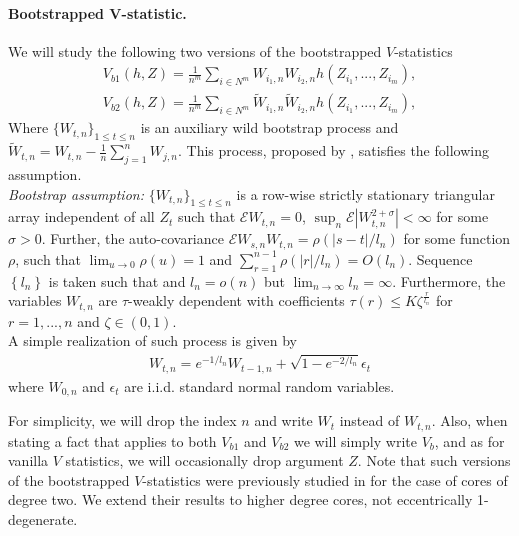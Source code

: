 \documentclass{article} %
\newcommand{\ev}{\mathcal{E}}
\begin{document}
\paragraph{Bootstrapped V-statistic.} 
We will study the following two versions of the bootstrapped $V$-statistics  
\begin{align}
 V_{b1}(h,Z) = \frac{1}{n^m} \sum_{i \in N^m} W_{i_1,n} W_{i_2,n} h(Z_{i_1},...,Z_{i_m}), \label{Vb1}\\ 
 V_{b2}(h,Z) = \frac{1}{n^m} \sum_{i \in N^m} \tilde W_{i_1,n}  \tilde W_{i_2,n} h(Z_{i_1},...,Z_{i_m}),\label{Vb2}
\end{align}
Where $\{W_{t,n}\}_{1 \leq t \leq n }$ is an auxiliary wild bootstrap process and $\tilde W_{t,n} = W_{t,n} - \frac 1 n \sum_{j=1}^n W_{j,n}$. This process, proposed by \cite{Shao2010,leucht_dependent_2013}, satisfies the following assumption.\\
\textit{Bootstrap assumption:} $\{W_{t,n}\}_{1 \leq t \leq n }$ is a row-wise strictly stationary triangular array independent of all $Z_t$ such that $\ev W_{t,n}=0$, $\sup_{n} \ev|W_{t,n}^{2+\sigma}| < \infty$ for some $\sigma > 0$. Further, the auto-covariance $\ev W_{s,n} W_{t,n}=\rho(|s-t|/l_n)$ for some function $\rho$, such that $\lim_{u \to 0} \rho(u) = 1$ and $\sum_{r=1}^{n-1} \rho(|r|/l_n)= O(l_n)$. Sequence $\left\{l_n\right\}$ is taken such that and $l_n=o(n)$ but $\lim_{n \to \infty} l_n = \infty$. Furthermore, the variables $W_{t,n}$  are $\tau$-weakly dependent with coefficients $\tau(r) \leq K \zeta^{\frac{r} {l_n}}$ for $r=1,...,n$ and $\zeta \in (0,1)$. \\
A simple realization of such process is given by 
\begin{align}
W_{t,n} = e^{-1/l_n}W_{t-1,n} + \sqrt{1 -e^{-2/l_n}} \epsilon_t \label{OU-wild}
\end{align}
where $W_{0,n}$ and $\epsilon_t$ are i.i.d. standard normal random variables. 

For simplicity, we will drop the index $n$ and write $W_t$ instead of $W_{t,n}$. Also, when stating a fact that applies to both $V_{b1}$ and $V_{b2}$ we will simply write $V_b$, and as for vanilla $V$ statistics, we will occasionally drop argument $Z$. Note that such versions of the bootstrapped $V$-statistics were previously studied in \cite{leucht_dependent_2013} for the case of cores of degree two. We extend their results to higher degree cores, not eccentrically 1-degenerate.\\
\end{document}
